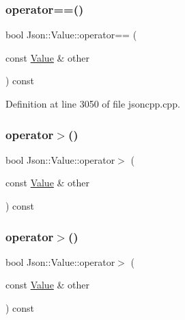 \subsubsection{\texorpdfstring{operator==()}{operator==()}\hspace{0.1cm}{\footnotesize\ttfamily [2/2]}}
{\footnotesize\ttfamily bool Json\+::\+Value\+::operator== (\begin{DoxyParamCaption}\item[{const \hyperlink{class_json_1_1_value}{Value} \&}]{other }\end{DoxyParamCaption}) const}



Definition at line 3050 of file jsoncpp.\+cpp.

\hypertarget{class_json_1_1_value_a4646c2f0764908c0972160c7c2ebe567}{}\label{class_json_1_1_value_a4646c2f0764908c0972160c7c2ebe567} 
\subsubsection{\texorpdfstring{operator$>$()}{operator>()}\hspace{0.1cm}{\footnotesize\ttfamily [1/2]}}
{\footnotesize\ttfamily bool Json\+::\+Value\+::operator$>$ (\begin{DoxyParamCaption}\item[{const \hyperlink{class_json_1_1_value}{Value} \&}]{other }\end{DoxyParamCaption}) const}

\hypertarget{class_json_1_1_value_a4646c2f0764908c0972160c7c2ebe567}{}\label{class_json_1_1_value_a4646c2f0764908c0972160c7c2ebe567} 
\subsubsection{\texorpdfstring{operator$>$()}{operator>()}\hspace{0.1cm}{\footnotesize\ttfamily [2/2]}}
{\footnotesize\ttfamily bool Json\+::\+Value\+::operator$>$ (\begin{DoxyParamCaption}\item[{const \hyperlink{class_json_1_1_value}{Value} \&}]{other }\end{DoxyParamCaption}) const}



